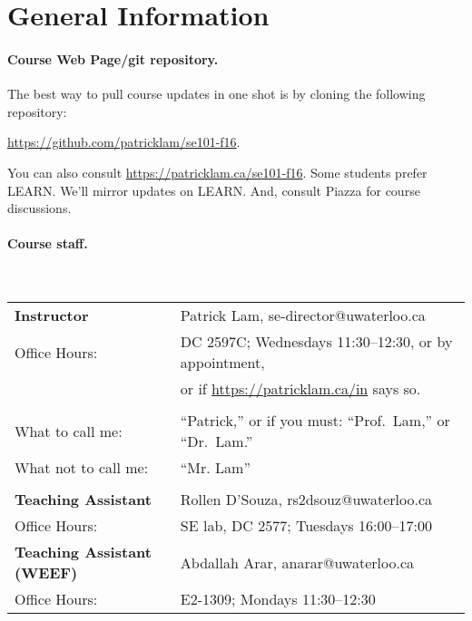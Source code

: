 \documentclass[11pt,onecolumn]{article}
\begin{document}
\section*{General Information}

\paragraph{Course Web Page/git repository.} 

The best way to pull course updates in one shot is by cloning the following repository:

\begin{center}
\url{https://github.com/patricklam/se101-f16}.
\end{center}

You can also consult \url{https://patricklam.ca/se101-f16}. Some students prefer LEARN. We'll mirror updates on LEARN. And, consult Piazza for course discussions.

\paragraph{Course staff.}~\\[1em]
\begin{tabular}{ll}
{\bf Instructor} & Patrick Lam, se-director@uwaterloo.ca\\
Office Hours:& DC 2597C; Wednesdays 11:30--12:30, or by appointment,\\
& or if \url{https://patricklam.ca/in} says so.\\ \\

What to call me:& ``Patrick,'' or if you must: ``Prof.~Lam,'' or ``Dr.~Lam.''\\
What not to call me:& ``Mr. Lam''\\ \\

{\bf Teaching Assistant} &
Rollen D'Souza, rs2dsouz@uwaterloo.ca\\
Office Hours:& SE lab, DC 2577; Tuesdays 16:00--17:00\\[1em]
{\bf Teaching Assistant (WEEF)} &
Abdallah Arar, anarar@uwaterloo.ca\\
Office Hours:& E2-1309; Mondays 11:30--12:30 \\
\end{tabular}
\end{document}
